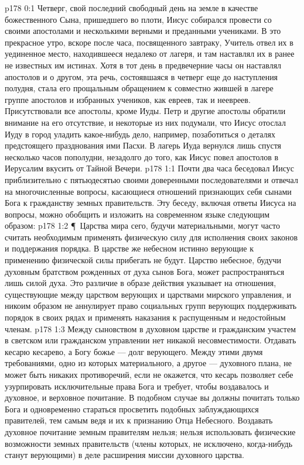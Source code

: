 \author{Комиссия срединников}
\vs p178 0:1 Четверг, свой последний свободный день на земле в качестве божественного Сына, пришедшего во плоти, Иисус собирался провести со своими апостолами и несколькими верными и преданными учениками. В это прекрасное утро, вскоре после часа, посвященного завтраку, Учитель отвел их в уединенное место, находившееся недалеко от лагеря, и там наставлял их в ранее не известных им истинах. Хотя в тот день в предвечерние часы он наставлял апостолов и о другом, эта речь, состоявшаяся в четверг еще до наступления полудня, стала его прощальным обращением к совместно жившей в лагере группе апостолов и избранных учеников, как евреев, так и неевреев. Присутствовали все апостолы, кроме Иуды. Петр и другие апостолы обратили внимание на его отсутствие, и некоторые из них подумали, что Иисус отослал Иуду в город уладить какое\hyp{}нибудь дело, например, позаботиться о деталях предстоящего празднования ими Пасхи. В лагерь Иуда вернулся лишь спустя несколько часов пополудни, незадолго до того, как Иисус повел апостолов в Иерусалим вкусить от Тайной Вечери.
\vs p178 1:1 Почти два часа беседовал Иисус приблизительно с пятьюдесятью своими доверенными последователями и отвечал на многочисленные вопросы, касающиеся отношений признающих себя сынами Бога к гражданству земных правительств. Эту беседу, включая ответы Иисуса на вопросы, можно обобщить и изложить на современном языке следующим образом:
\vs p178 1:2 \P\ Царства мира сего, будучи материальными, могут часто считать необходимым применять физическую силу для исполнения своих законов и поддержания порядка. В царстве же небесном истинно верующие к применению физической силы прибегать не будут. Царство небесное, будучи духовным братством рожденных от духа сынов Бога, может распространяться лишь силой духа. Это различие в образе действия указывает на отношения, существующие между царством верующих и царствами мирского управления, и никоим образом не аннулирует право социальных групп верующих поддерживать порядок в своих рядах и применять наказания к распущенным и недостойным членам.
\vs p178 1:3 Между сыновством в духовном царстве и гражданским участем в светском или гражданском управлении нет никакой несовместимости. Отдавать кесарю кесарево, а Богу божье --- долг верующего. Между этими двумя требованиями, одно из которых материального, а другое --- духовного плана, не может быть никаких противоречий, если не окажется, что кесарь позволяет себе узурпировать исключительные права Бога и требует, чтобы воздавалось и духовное, и верховное почитание. В подобном случае вы должны почитать только Бога и одновременно стараться просветить подобных заблуждающихся правителей, тем самым ведя и их к признанию Отца Небесного. Воздавать духовное почитание земным правителям нельзя; нельзя использовать физические возможности земных правительств (члены которых, не исключено, когда\hyp{}нибудь станут верующими) в деле расширения миссии духовного царства.

